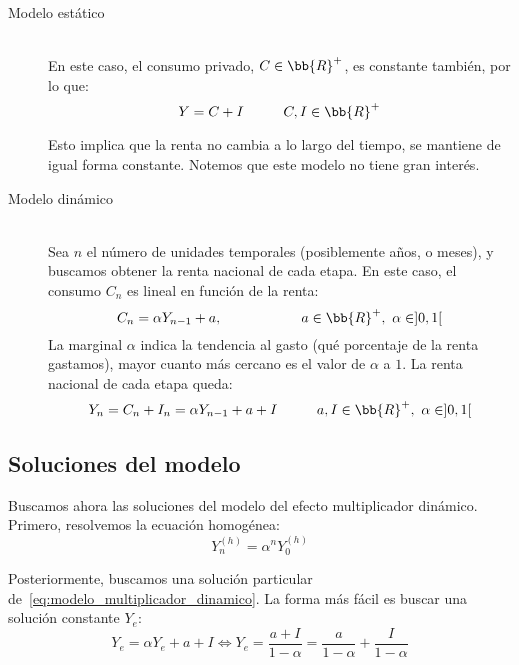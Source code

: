 \begin{description}
    \item[Modelo estático]~\\
    En este caso, el consumo privado, $C\in \bb{R}^+$, es constante también, por lo que:
    \begin{equation*}
        Y = C+I\hspace{1cm} C,I\in \bb{R}^+
    \end{equation*}

    Esto implica que la renta no cambia a lo largo del tiempo, se mantiene de igual forma constante. Notemos que este modelo no tiene gran interés.
    
    \item[Modelo dinámico]~\\    
    Sea $n$ el número de unidades temporales (posiblemente años, o meses), y buscamos obtener la renta nacional de cada etapa. En este caso, el consumo $C_n$ es lineal en función de la renta:
    \begin{equation*}
        C_n = \alpha Y_{n-1}+a,\hspace{2cm} a\in \bb{R}^+,~\alpha\in ]0,1[
    \end{equation*}
    La marginal $\alpha$ indica la tendencia al gasto (qué porcentaje de la renta gastamos), mayor cuanto más cercano es el valor de $\alpha$ a $1$. La renta nacional de cada etapa queda:
    \begin{equation}\label{eq:modelo_multiplicador_dinamico}
        Y_n = C_n + I_n = \alpha Y_{n-1} + a +I \hspace{1cm} a,I\in \bb{R}^+,~\alpha\in ]0,1[
    \end{equation}
\end{description}

\subsection{Soluciones del modelo}
Buscamos ahora las soluciones del modelo del efecto multiplicador dinámico. Primero, resolvemos la ecuación homogénea:
$$Y_n^{(h)} = \alpha^n Y_0^{(h)}$$

Posteriormente, buscamos una solución particular de~\ref{eq:modelo_multiplicador_dinamico}. La forma más fácil es buscar una solución constante $Y_e$:
\begin{equation*}
    Y_e = \alpha Y_e + a + I \Longleftrightarrow Y_e = \dfrac{a+I}{1-\alpha} = \dfrac{a}{1-\alpha} + \dfrac{I}{1-\alpha}
\end{equation*}

